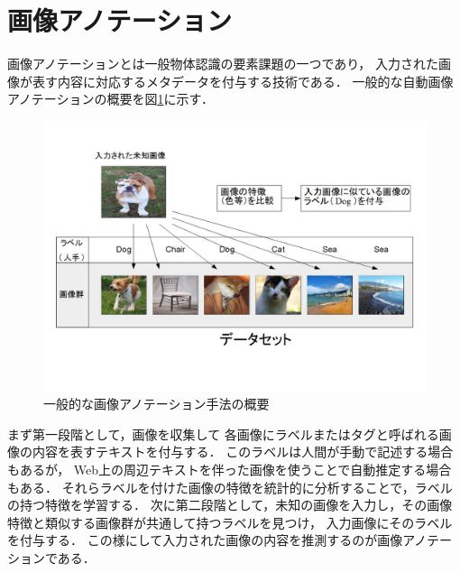 \section{画像アノテーション}

画像アノテーションとは一般物体認識の要素課題の一つであり，
入力された画像が表す内容に対応するメタデータを付与する技術である．
一般的な自動画像アノテーションの概要を図\ref{fig:abst}に示す．

\begin{figure}[tb]
 \begin{center}
  \includegraphics[scale=0.50]{gaiyou.jpg}
 \end{center}
 \caption{一般的な画像アノテーション手法の概要}
 \label{fig:abst}
\end{figure}

まず第一段階として，画像を収集して
各画像にラベルまたはタグと呼ばれる画像の内容を表すテキストを付与する．
このラベルは人間が手動で記述する場合もあるが，
Web上の周辺テキストを伴った画像を使うことで自動推定する場合もある．
それらラベルを付けた画像の特徴を統計的に分析することで，ラベルの持つ特徴を学習する．
次に第二段階として，未知の画像を入力し，その画像特徴と類似する画像群が共通して持つラベルを見つけ，
入力画像にそのラベルを付与する．
この様にして入力された画像の内容を推測するのが画像アノテーションである．

